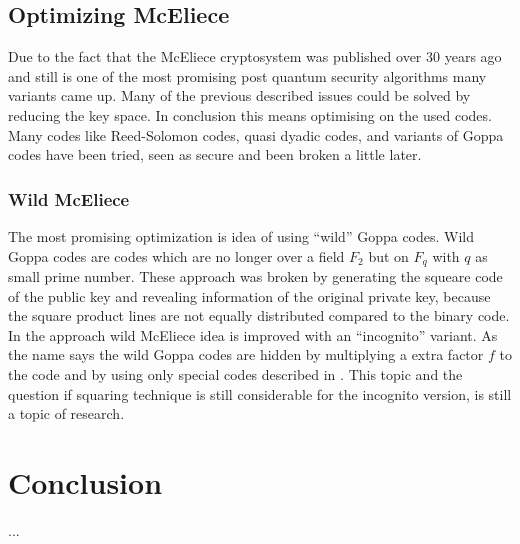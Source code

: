 \subsection*{Optimizing McEliece} %
Due to the fact that the McEliece cryptosystem was published over 30 years ago and still is one of the most promising post quantum security algorithms many variants came up. Many of the previous described issues could be solved by reducing the key space. In conclusion this means optimising on the used codes. Many codes like Reed-Solomon codes, quasi dyadic codes, and variants of Goppa codes have been tried, seen as secure and been broken a little later. 

\subsubsection*{Wild McEliece}
The most promising optimization is idea of using ``wild'' Goppa codes\cite{bernstein2010wild}. Wild Goppa codes are codes which are no longer over a field $F_2$ but on $F_q$ with $q$ as small prime number. These approach was broken by generating the squeare code of the public key and revealing information of the original private key, because the square product lines are not equally distributed compared to the binary code. In \cite{yang2011post} the approach wild McEliece idea is improved with an ``incognito'' variant. As the name says the wild Goppa codes are hidden by multiplying a extra factor $f$ to the code and by using only special codes described in \cite{berger2005mask}. This topic and the question if squaring technique is still considerable for the incognito version, is still a topic of research. 



\section{Conclusion}
...
